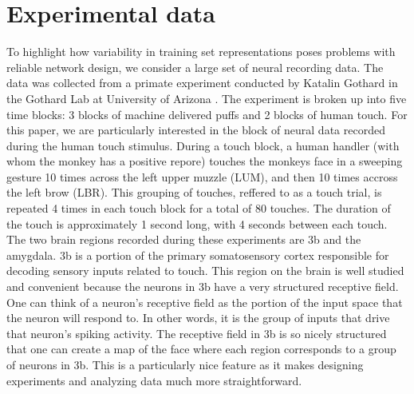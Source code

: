 \documentclass[12pt]{article}
\begin{document}
\section{Experimental data}To highlight how variability in training set representations poses problems with reliable network design, we consider a large set of neural recording data. The data was collected from a primate experiment conducted by Katalin Gothard in the Gothard Lab at University
of Arizona \cite{lab}. The experiment is broken up into five time blocks: 3 blocks of machine delivered puffs and 2 blocks of human touch. For this paper, we are particularly interested in the block of neural data recorded during the human touch stimulus. During a touch block, a human handler (with whom the monkey has a positive repore) touches the monkeys face in a sweeping gesture 10 times across the left upper muzzle (LUM), and then 10 times accross the left brow (LBR). This grouping of touches, reffered to as a touch trial, is repeated 4 times in each touch block for a total of 80 touches. The duration of the touch is approximately 1 second long, with 4 seconds between each touch.  \\
\indent The two brain regions recorded during these experiments are 3b and the amygdala. 3b is a portion of the primary somatosensory cortex responsible for decoding sensory inputs related to touch. This region on the brain is well studied and convenient because the neurons in 3b have a very structured receptive field. One can think of a neuron's receptive field as the portion of the input space that the neuron will respond to. In other words, it is the group of inputs that drive that neuron's spiking activity. The receptive field in 3b is so nicely structured that one can create a map of the face where each region corresponds to a group of neurons in 3b. This is a particularly nice feature as it makes designing experiments and analyzing data much more straightforward. \\
\end{document}
